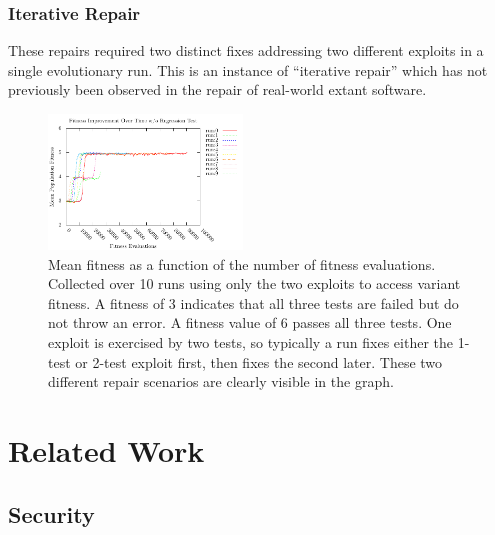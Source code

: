 \documentclass{sigcomm-alternate}
\begin{document}
\subsubsection{Iterative Repair}
\label{iterative-repair}
These repairs required two distinct fixes addressing two different
exploits in a single evolutionary run.  This is an instance of
``iterative repair'' which has not previously been observed in the
repair of real-world extant software.

\begin{figure}[htb]
  \centering
  \includegraphics[bb=0 0 355 248,width=0.46\textwidth]{fitness-improvement.pdf}
  \caption{Mean fitness as a function of the number of fitness
    evaluations.  Collected over 10 runs using only the two exploits
    to access variant fitness.  A fitness of 3 indicates that all
    three tests are failed but do not throw an error.  A fitness value
    of 6 passes all three tests.  One exploit is exercised by two
    tests, so typically a run fixes either the 1-test or 2-test
    exploit first, then fixes the second later.  These two different
    repair scenarios are clearly visible in the graph.}
  \label{fit-by-time}
\end{figure}

\section{Related Work}
\label{sec-5}
\subsection{Security}
\label{sec-5-1}
\end{document}
